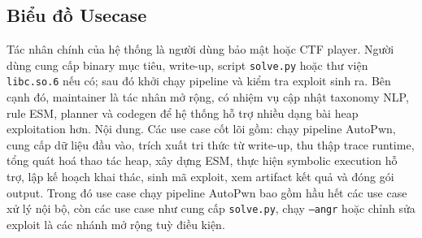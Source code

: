 \documentclass[final]{hcmuitthesis}
\begin{document}
\subsection{Biểu đồ Usecase}
Tác nhân chính của hệ thống là người dùng bảo mật hoặc CTF player. Người dùng cung cấp binary mục tiêu, write-up, script \texttt{solve.py} hoặc thư viện \texttt{libc.so.6} nếu có; sau đó khởi chạy pipeline và kiểm tra exploit sinh ra. Bên cạnh đó, maintainer là tác nhân mở rộng, có nhiệm vụ cập nhật taxonomy NLP, rule ESM, planner và codegen để hệ thống hỗ trợ nhiều dạng bài heap exploitation hơn.
Nội dung.
Các use case cốt lõi gồm: chạy pipeline AutoPwn, cung cấp dữ liệu đầu vào, trích xuất tri thức từ write-up, thu thập trace runtime, tổng quát hoá thao tác heap, xây dựng ESM, thực hiện symbolic execution hỗ trợ, lập kế hoạch khai thác, sinh mã exploit, xem artifact kết quả và đóng gói output. Trong đó use case chạy pipeline AutoPwn bao gồm hầu hết các use case xử lý nội bộ, còn các use case như cung cấp \texttt{solve.py}, chạy \texttt{--angr} hoặc chỉnh sửa exploit là các nhánh mở rộng tuỳ điều kiện.
\end{document}
